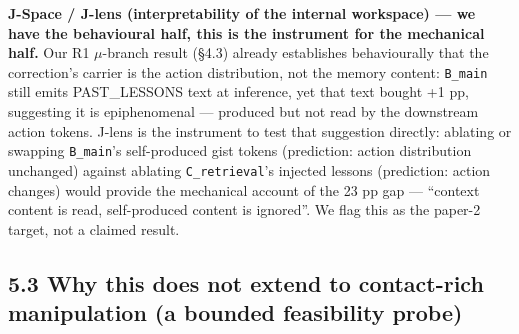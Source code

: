 \textbf{J-Space / J-lens (interpretability of the internal workspace) --- we
have the behavioural half, this is the instrument for the mechanical
half.} Our R1 $\mu$-branch result (\S4.3) already establishes behaviourally
that the correction's carrier is the action distribution, not the
memory content: \texttt{B\_main} still emits PAST\_LESSONS text at inference,
yet that text bought +1 pp, suggesting it is epiphenomenal --- produced
but not read by the downstream action tokens. J-lens is the instrument
to test that suggestion directly: ablating or swapping \texttt{B\_main}'s
self-produced gist tokens (prediction: action distribution unchanged)
against ablating \texttt{C\_retrieval}'s injected lessons (prediction: action
changes) would provide the mechanical account of the 23 pp gap ---
``context content is read, self-produced content is ignored''. We flag
this as the paper-2 target, not a claimed result.

\subsection*{5.3 Why this does not extend to contact-rich manipulation (a bounded feasibility probe)}

